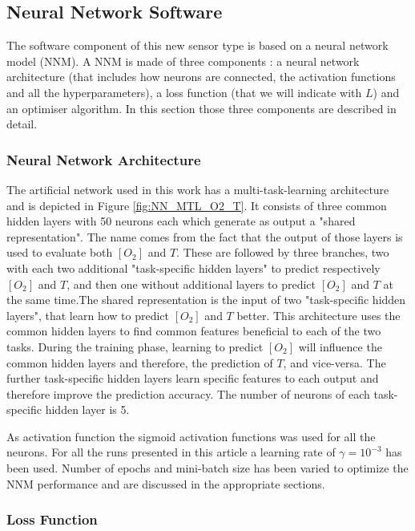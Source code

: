 \documentclass[9pt,twocolumn,twoside,pdftex]{optica}
\begin{document}

\subsection{Neural Network Software}
\label{NN}



The software component of this new sensor type is based on a neural network model (NNM). A NNM is made of three components \cite{Michelucci2017}: a neural network architecture (that includes how neurons are connected, the activation functions and all the hyperparameters), a loss function (that we will indicate with $L$) and an optimiser algorithm. In this section those three components are described in detail.

\subsubsection{Neural Network Architecture}

The artificial network used in this work has a multi-task-learning architecture and is depicted in Figure \ref{fig:NN_MTL_O2_T}. It consists of three common hidden layers with 50 neurons each which generate as output a "shared representation". The name comes from the fact that the output of those layers is used to evaluate both $[O_2]$ and $T$. These are followed by three branches, two with each two additional "task-specific hidden layers" to predict respectively $[O_2]$ and $T$, and then one without additional layers to predict $[O_2]$ and $T$ at the same time.The shared representation is the input of two "task-specific hidden layers", that learn how to predict $[O_2]$ and $T$ better. This architecture uses the common hidden layers to find common features beneficial to each of the two tasks. During the training phase, learning to predict $[O_2]$ will influence the common hidden layers and therefore, the prediction of $T$, and vice-versa. The further task-specific hidden layers learn specific features to each output and therefore improve the prediction accuracy. The number of neurons of each task-specific hidden layer is 5.

As activation function the sigmoid activation functions was used for all the neurons. For all the runs presented in this article a learning rate of $\gamma = 10^{-3}$ has been used. Number of epochs and mini-batch size has been varied to optimize the NNM performance and are discussed in the appropriate sections.

\subsubsection{Loss Function}
\end{document}
